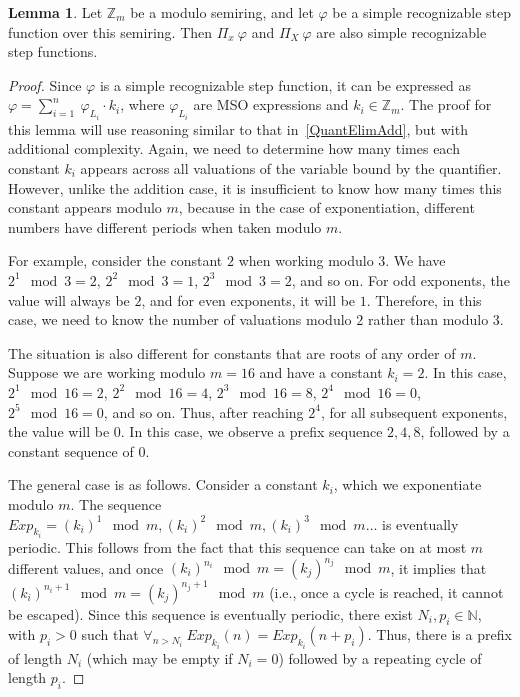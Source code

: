 \documentclass[12pt]{article}
\theoremstyle{definition}
\newtheorem{lemma}[theorem]{Lemma}
\begin{document}
\begin{lemma}
    \label{QuantElimMult}
    Let $\mathbb{Z}_m$ be a modulo semiring, and let $\varphi$ be a simple recognizable step function over this semiring. Then $\Pi_x \ \varphi$ and $\Pi_X \ \varphi$ are also simple recognizable step functions.
\end{lemma}

\begin{proof}
    Since $\varphi$ is a simple recognizable step function, it can be expressed as $\varphi = \sum_{i = 1}^{n} \ \varphi_{L_i} \cdot k_i$, where $\varphi_{L_i}$ are MSO expressions and $k_i \in \mathbb{Z}_m$. The proof for this lemma will use reasoning similar to that in~\cref{QuantElimAdd}, but with additional complexity. Again, we need to determine how many times each constant $k_i$ appears across all valuations of the variable bound by the quantifier. However, unlike the addition case, it is insufficient to know how many times this constant appears modulo $m$, because in the case of exponentiation, different numbers have different periods when taken modulo $m$. 
    
    For example, consider the constant $2$ when working modulo $3$. We have $2^1 \mod 3 = 2$, $2^2 \mod 3 = 1$, $2^3 \mod 3 = 2$, and so on. For odd exponents, the value will always be $2$, and for even exponents, it will be $1$. Therefore, in this case, we need to know the number of valuations modulo $2$ rather than modulo $3$. 

    The situation is also different for constants that are roots of any order of $m$. Suppose we are working modulo $m = 16$ and have a constant $k_i = 2$. In this case, $2^1 \mod 16 = 2$, $2^2 \mod 16 = 4$, $2^3 \mod 16 = 8$, $2^4 \mod 16 = 0$, $2^5 \mod 16 = 0$, and so on. Thus, after reaching $2^4$, for all subsequent exponents, the value will be $0$. In this case, we observe a prefix sequence $2,4,8$, followed by a constant sequence of $0$.

    The general case is as follows. Consider a constant $k_i$, which we exponentiate modulo $m$. The sequence $Exp_{k_i} = (k_i)^1 \mod m, (k_i)^2 \mod m, (k_i)^3 \mod m \ldots$ is eventually periodic. This follows from the fact that this sequence can take on at most $m$ different values, and once $(k_i)^{n_i} \mod m = (k_j)^{n_j} \mod m$, it implies that $(k_i)^{n_i + 1} \mod m = (k_j)^{n_j + 1} \mod m$ (i.e., once a cycle is reached, it cannot be escaped). Since this sequence is eventually periodic, there exist $N_i, p_i \in \mathbb{N}$, with $p_i > 0$ such that $\forall_{n > N_i} \ Exp_{k_i}(n) = Exp_{k_i}(n + p_i)$. Thus, there is a prefix of length $N_i$ (which may be empty if $N_i = 0$) followed by a repeating cycle of length $p_i$. 


\end{proof}
\end{document}
